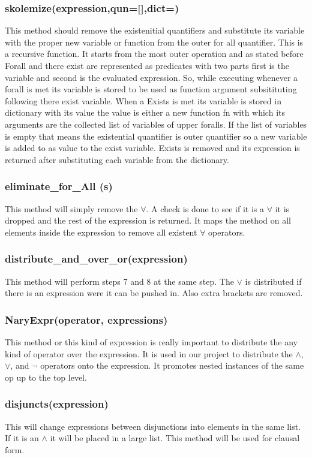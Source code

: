 {\subsubsection{skolemize(expression,qun=[],dict={})}
This method should remove the existenitial quantifiers and substitute its
variable with the proper new variable or function from the outer for all
quantifier. This is a recursive function. It starts from the most outer
operation and as stated before Forall and there exist are represented as
predicates with two parts first is the variable and second is the evaluated
expression. So, while executing whenever a forall is met its variable is
stored to be used as function argument subsitituting following there exist
variable. When a Exists is met its variable is stored in dictionary with its value the value is either a new function fn with
which its arguments are the collected list of variables of upper foralls. If the
list of variables is empty that means the existential quantifier is outer
quantifier so a new variable is added to as value to the exist variable. Exists
is removed and its expression is returned after substituting each variable from the dictionary.
\subsubsection{eliminate\_for\_All (s)}
This method will simply remove the $\forall$. A check is done to see if it is a $\forall$ it is dropped and the rest of the expression is returned. It maps the method on all elements inside the expression to remove all existent $\forall$ operators.
\subsubsection{distribute\_and\_over\_or(expression)}
This method will perform steps 7 and 8 at the same step. The $\vee$ is distributed if there is an expression were it can be pushed in. Also extra brackets are removed.
\subsubsection{NaryExpr(operator, expressions)}
This method or this kind of expression is really important to distribute the any kind of operator over the expression. It is used in our project to distribute the $\wedge$, $\vee$, and $\neg$ operators onto the expression. It promotes nested instances of the same op up to the top level.
\subsubsection{disjuncts(expression)}
This will change expressions between disjunctions into elements in the same list. If it is an $\wedge$ it will be placed in a large list. This method will be used for clausal form.
}
